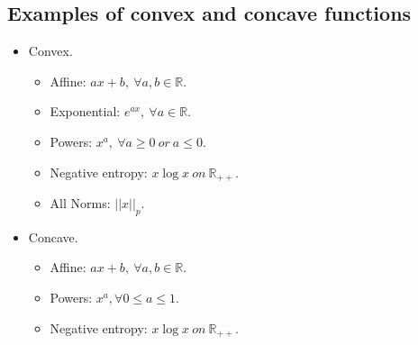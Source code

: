 \subsection{Examples of convex and concave functions}
\begin{itemize}
    \item Convex.
    \begin{itemize}
        \item Affine: $ax + b, \ \forall a, b \in \mathbb{R}$.
        \item Exponential: $e^{ax}, \ \forall a \in \mathbb{R}$.
        \item Powers: $x^a, \ \forall a \ge 0 \ or \ a \le 0$.
        \item Negative entropy: $x\log x \ on \ \mathbb{R}_{++}$.
        \item All Norms: $||x||_p$.
    \end{itemize}
    \item Concave.
    \begin{itemize}
        \item Affine: $ax + b, \ \forall a, b \in \mathbb{R}$.
        \item Powers: $x^a, \forall 0 \le a \le 1$.
        \item Negative entropy: $x\log x \ on \ \mathbb{R}_{++}$.
    \end{itemize}
\end{itemize}

